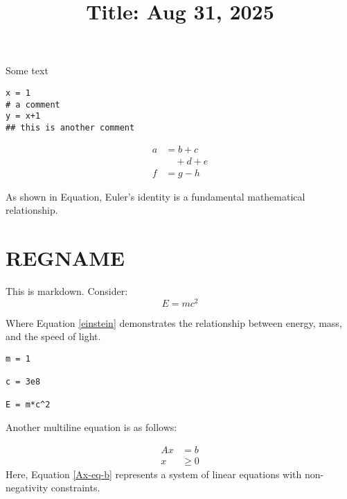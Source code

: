 \documentclass{article}
\title{Title: Aug 31, 2025}
\begin{document}
\maketitle


Some text 

\begin{verbatim}
x = 1
# a comment
y = x+1
## this is another comment
\end{verbatim}


\begin{equation*}
\begin{aligned}
  a &= b + c \\
  & \quad + d + e \\
  f &= g - h
\end{aligned}
\end{equation*}



As shown in Equation, Euler's identity is a fundamental mathematical relationship.
\section{REGNAME}
This is markdown. Consider: 
\begin{equation}\label{einstein}
E = mc^2
\end{equation}

Where Equation \eqref{einstein} demonstrates the relationship between energy, mass, and the speed of light.

\begin{verbatim}
m = 1

c = 3e8

E = m*c^2
\end{verbatim}


Another multiline equation is as follows: 

\begin{equation}\label{Ax-eq-b}
\begin{aligned}
  Ax &= b \\
  x &\ge 0
\end{aligned}
\end{equation}
Here, Equation \eqref{Ax-eq-b} represents a system of linear equations with non-negativity constraints.
\end{document}
